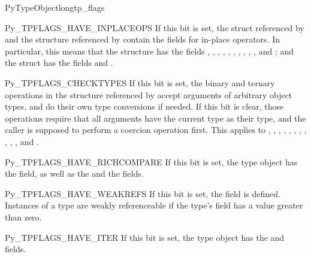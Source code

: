 \begin{cmemberdesc}{PyTypeObject}{long}{tp_flags}
  \begin{datadesc}{Py_TPFLAGS_HAVE_INPLACEOPS}
    If this bit is set, the  struct
    referenced by  and the
     structure referenced by
     contain the fields for in-place operators.
    In particular, this means that the 
    structure has the fields ,
    , ,
    , ,
    , ,
    , ,
    , and ; and the
     struct has the fields
     and .
  \end{datadesc}

  \begin{datadesc}{Py_TPFLAGS_CHECKTYPES}
    If this bit is set, the binary and ternary operations in the
     structure referenced by
     accept arguments of arbitrary object types,
    and do their own type conversions if needed.  If this bit is
    clear, those operations require that all arguments have the
    current type as their type, and the caller is supposed to perform
    a coercion operation first.  This applies to ,
    , , ,
    , , ,
    , , ,
    , and .
  \end{datadesc}

  \begin{datadesc}{Py_TPFLAGS_HAVE_RICHCOMPARE}
    If this bit is set, the type object has the
     field, as well as the 
    and the  fields.
  \end{datadesc}

  \begin{datadesc}{Py_TPFLAGS_HAVE_WEAKREFS}
    If this bit is set, the  field is
    defined.  Instances of a type are weakly referenceable if the
    type's  field has a value greater than
    zero.
  \end{datadesc}

  \begin{datadesc}{Py_TPFLAGS_HAVE_ITER}
    If this bit is set, the type object has the  and
     fields.
  \end{datadesc}


\end{cmemberdesc}
